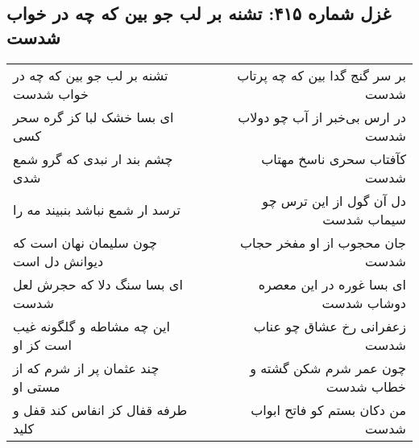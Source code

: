 \begin{center}
\section*{غزل شماره ۴۱۵: تشنه بر لب جو بین که چه در خواب شدست}
\label{sec:0415}
\begin{longtable}{l p{0.5cm} r}
تشنه بر لب جو بین که چه در خواب شدست
&&
بر سر گنج گدا بین که چه پرتاب شدست
\\
ای بسا خشک لبا کز گره سحر کسی
&&
در ارس بی‌خبر از آب چو دولاب شدست
\\
چشم بند ار نبدی که گرو شمع شدی
&&
کآفتاب سحری ناسخ مهتاب شدست
\\
ترسد ار شمع نباشد بنبیند مه را
&&
دل آن گول از این ترس چو سیماب شدست
\\
چون سلیمان نهان است که دیوانش دل است
&&
جان محجوب از او مفخر حجاب شدست
\\
ای بسا سنگ دلا که حجرش لعل شدست
&&
ای بسا غوره در این معصره دوشاب شدست
\\
این چه مشاطه و گلگونه غیب است کز او
&&
زعفرانی رخ عشاق چو عناب شدست
\\
چند عثمان پر از شرم که از مستی او
&&
چون عمر شرم شکن گشته و خطاب شدست
\\
طرفه قفال کز انفاس کند قفل و کلید
&&
من دکان بستم کو فاتح ابواب شدست
\\
\end{longtable}
\end{center}
